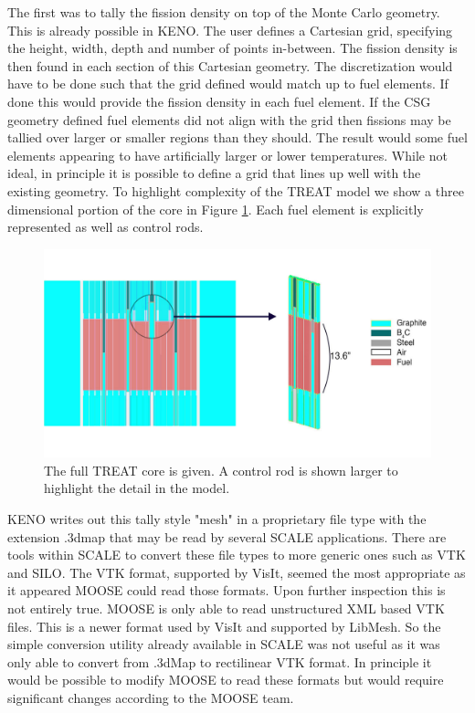 \documentclass[11pt]{article}
\begin{document}
The first was to tally the fission density on top of the Monte Carlo geometry.  This is already possible in KENO.  The user defines a Cartesian grid, specifying the height, width, depth and number of points in-between.   The fission density is then found in each section of this Cartesian geometry.  The discretization would have to be done such that the grid defined would match up to fuel elements.  If done this would provide the fission density in each fuel element.  If the CSG geometry defined fuel elements did not align with the grid then fissions may be tallied over larger or smaller regions than they should.  The result would some fuel elements appearing to have artificially larger or lower temperatures.  While not ideal, in principle it is possible to define a grid that lines up well with the existing geometry.  To highlight complexity of the TREAT model we show a three dimensional portion of the core in Figure \ref{fig:treat3d}. Each fuel element is explicitly represented as well as control rods. 

\begin{figure}[h]
    \centering
    \includegraphics[width=14cm]{figures/big_to_small}
    \caption{The full TREAT core is given.  A control rod is shown larger to highlight the detail in the model.}
    \label{fig:treat3d}
\end{figure}

KENO writes out this tally style "mesh" in a proprietary file type with the extension .3dmap that may be read by several SCALE applications.  There are tools within SCALE to convert these file types to more generic ones such as VTK and SILO.  The VTK format, supported by VisIt, seemed the most appropriate as it appeared MOOSE could read those formats.  Upon further inspection this is not entirely true. MOOSE is only able to read unstructured XML based VTK files.  This is a newer format used by VisIt and supported by LibMesh.  So the simple conversion utility already available in SCALE was not useful as it was only able to convert from .3dMap to rectilinear VTK format.  In principle it would be possible to modify MOOSE to read these formats but would require significant changes according to the MOOSE team.  
\end{document}
